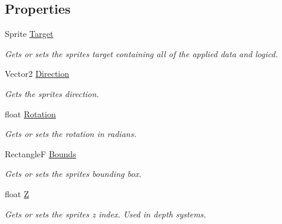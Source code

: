\subsection*{Properties}
\begin{DoxyCompactItemize}
\item 
Sprite \hyperlink{class_midnight_blue_1_1_engine_1_1_entity_component_1_1_sprite_transform_aa9f62a2dee11bd9b7ac9af85d5db66f0}{Target}
\begin{DoxyCompactList}\small\item\em Gets or sets the sprites target containing all of the applied data and logicd. \end{DoxyCompactList}\item 
Vector2 \hyperlink{class_midnight_blue_1_1_engine_1_1_entity_component_1_1_sprite_transform_a604c8f75b4527c35c5695bfaed23d598}{Direction}
\begin{DoxyCompactList}\small\item\em Gets the sprites direction. \end{DoxyCompactList}\item 
float \hyperlink{class_midnight_blue_1_1_engine_1_1_entity_component_1_1_sprite_transform_a55c820944bd2e9aaef4504b2010f5f14}{Rotation}
\begin{DoxyCompactList}\small\item\em Gets or sets the rotation in radians. \end{DoxyCompactList}\item 
RectangleF \hyperlink{class_midnight_blue_1_1_engine_1_1_entity_component_1_1_sprite_transform_abd92856357f0c04ee40ef7b6ab15a411}{Bounds}
\begin{DoxyCompactList}\small\item\em Gets or sets the sprites bounding box. \end{DoxyCompactList}\item 
float \hyperlink{class_midnight_blue_1_1_engine_1_1_entity_component_1_1_sprite_transform_aa26777c6bccabaf04ea51453feabab6e}{Z}
\begin{DoxyCompactList}\small\item\em Gets or sets the sprites z index. Used in depth systems. \end{DoxyCompactList}\end{DoxyCompactItemize}


